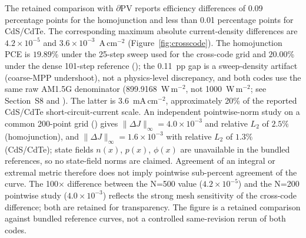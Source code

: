 
The retained comparison with $\partial\mathrm{PV}$ reports efficiency
differences of 0.09 percentage points for the homojunction and less than
0.01 percentage points for CdS/CdTe. The corresponding maximum absolute
current-density differences are $4.2\times10^{-5}$ and
$3.6\times10^{-3}$~A\,cm$^{-2}$ (Figure~\ref{fig:crosscode}). The
homojunction PCE is $19.89$\% under the 25-step sweep used for the
cross-code grid and $20.00$\% under the dense 101-step reference
(); the 0.11~pp gap is a
sweep-density artifact (coarse-MPP undershoot), not a physics-level
discrepancy, and both codes use the same raw AM1.5G denominator
(899.9168~W\,m$^{-2}$, not 1000~W\,m$^{-2}$; see Section~S8 and
). The latter
is 3.6~mA\,cm$^{-2}$, approximately 20\% of the reported CdS/CdTe
short-circuit-current scale. An independent pointwise-norm study on a
common 200-point grid
() gives
$\|{\Delta J}\|_\infty=4.0\times10^{-3}$ and relative $L_2$ of $2.5\%$
(homojunction), and $\|{\Delta J}\|_\infty=1.6\times10^{-3}$ with
relative $L_2$ of $1.3\%$ (CdS/CdTe); state fields $n(x)$, $p(x)$,
$\phi(x)$ are unavailable in the bundled references, so no state-field
norms are claimed. Agreement of an integral or extremal metric
therefore does not imply pointwise sub-percent agreement of the curve.
The 100$\times$ difference between the N=500 value ($4.2\times10^{-5}$)
and the N=200 pointwise study ($4.0\times10^{-3}$) reflects the strong
mesh sensitivity of the cross-code difference; both are retained for
transparency. The figure is a retained comparison against bundled reference curves,
not a controlled same-revision rerun of both codes.

